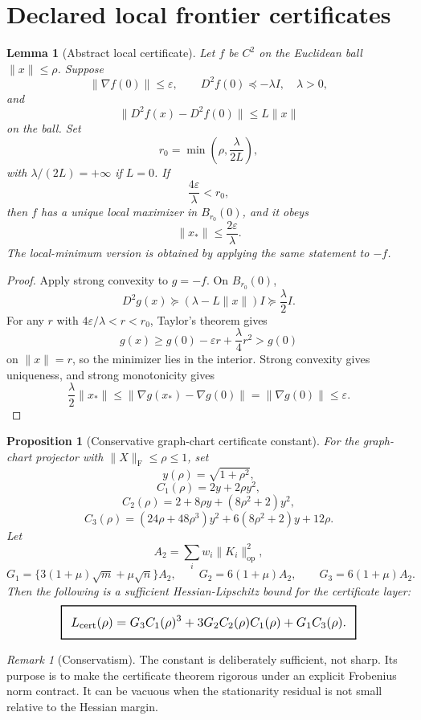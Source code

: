 \documentclass[11pt,a4paper]{article}
\numberwithin{equation}{section}
\newcommand{\Frob}{\mathrm F}
\newcommand{\geomboxed}[1]{%
  \setlength{\fboxsep}{8pt}%
  \setlength{\fboxrule}{0.9pt}%
  \fbox{\scalebox{1.12}{$\displaystyle #1$}}%
}
\theoremstyle{thmcompact}
\newtheorem{proposition}[theorem]{Proposition}
\newtheorem{lemma}[theorem]{Lemma}
\theoremstyle{remark}
\newtheorem*{remarkplain}{Remark}
\newenvironment{remark}[1][]%
{\begin{remarkbox}\begin{remarkplain}[#1]\normalfont}
{\end{remarkplain}\end{remarkbox}}
\begin{document}
\section{Declared local frontier certificates}

\begin{lemma}[Abstract local certificate]
\label{lem:abstract-certificate}
Let $f$ be $C^2$ on the Euclidean ball $\|x\|\le \rho$. Suppose
\[
\|\nabla f(0)\|\le \varepsilon,\qquad
D^2f(0)\preceq -\lambda I,\quad \lambda>0,
\]
and
\[
\|D^2f(x)-D^2f(0)\|\le L\|x\|
\]
on the ball. Set
\[
r_0=\min\left(\rho,\frac{\lambda}{2L}\right),
\]
with $\lambda/(2L)=+\infty$ if $L=0$. If
\[
\frac{4\varepsilon}{\lambda}<r_0,
\]
then $f$ has a unique local maximizer in $B_{r_0}(0)$, and it obeys
\[
\|x_*\|\le \frac{2\varepsilon}{\lambda}.
\]
The local-minimum version is obtained by applying the same statement to $-f$.
\end{lemma}

\begin{proof}
Apply strong convexity to $g=-f$. On $B_{r_0}(0)$,
\[
D^2g(x)\succeq (\lambda-L\|x\|)I\succeq \frac{\lambda}{2}I.
\]
For any $r$ with $4\varepsilon/\lambda<r<r_0$, Taylor's theorem gives
\[
g(x)\ge g(0)-\varepsilon r+\frac{\lambda}{4}r^2>g(0)
\]
on $\|x\|=r$, so the minimizer lies in the interior. Strong convexity gives uniqueness, and strong monotonicity gives
\[
\frac{\lambda}{2}\|x_*\|\le \|\nabla g(x_*)-\nabla g(0)\|=\|\nabla g(0)\|\le\varepsilon.
\]
\end{proof}

\begin{proposition}[Conservative graph-chart certificate constant]
\label{prop:certificate-constant}
For the graph-chart projector with $\|X\|_\Frob\le\rho\le1$, set
\[
y(\rho)=\sqrt{1+\rho^2},
\]
\[
C_1(\rho)=2y+2\rho y^2,
\]
\[
C_2(\rho)=2+8\rho y+(8\rho^2+2)y^2,
\]
\[
C_3(\rho)=(24\rho+48\rho^3)y^2+6(8\rho^2+2)y+12\rho.
\]
Let
\[
A_2=\sum_i w_i\|K_i\|_{\mathrm{op}}^2,
\]
\[
G_1=\{3(1+\mu)\sqrt m+\mu\sqrt n\}A_2,\qquad
G_2=6(1+\mu)A_2,\qquad
G_3=6(1+\mu)A_2.
\]
Then the following is a sufficient Hessian-Lipschitz bound for the certificate layer:
\[
\geomboxed{
L_{\mathrm{cert}}(\rho)
=G_3C_1(\rho)^3+3G_2C_2(\rho)C_1(\rho)+G_1C_3(\rho).
}
\]
\end{proposition}

\begin{remark}[Conservatism]
The constant is deliberately sufficient, not sharp. Its purpose is to make the certificate theorem rigorous under an explicit Frobenius norm contract. It can be vacuous when the stationarity residual is not small relative to the Hessian margin.
\end{remark}
\end{document}
